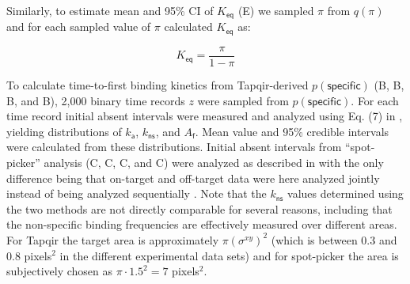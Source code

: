 Similarly, to estimate mean and 95\% CI of $K_\mathsf{eq}$ (E) we sampled $\pi$ from $q(\pi)$ and for each sampled value of $\pi$ calculated $K_\mathsf{eq}$ as:

\begin{equation}
    K_\mathsf{eq} = \dfrac{\pi}{1 - \pi}
\end{equation}

To calculate  time-to-first binding kinetics from Tapqir-derived $p(\mathsf{specific})$ (B, B, B, and B), 2,000 binary time records $z$ were sampled from $p(\mathsf{specific})$. For each time record initial absent intervals were measured and analyzed using Eq. (7) in \cite{Friedman2015-nx}, yielding distributions of $k_\mathsf{a}$, $k_\mathsf{ns}$, and $A_\mathsf{f}$. Mean value and 95\% credible intervals were calculated from these distributions. Initial absent intervals from ``spot-picker'' analysis (C, C, C, and C) were analyzed as described in \citep{Friedman2015-nx} with the only difference being that on-target and off-target data were here analyzed jointly instead of being analyzed sequentially \citep{Friedman2015-nx}.  Note that the $k_\mathsf{ns}$ values determined using the two methods are not directly comparable for several reasons, including that the non-specific binding frequencies are effectively measured over different areas. For Tapqir the target area is approximately $ \pi \left( \sigma^{xy} \right) ^2$ (which is between 0.3 and 0.8 pixels$^2$ in the different experimental data sets) and for spot-picker the area is subjectively chosen as $\pi \cdot 1.5^2 = 7$ pixels$^2$.



